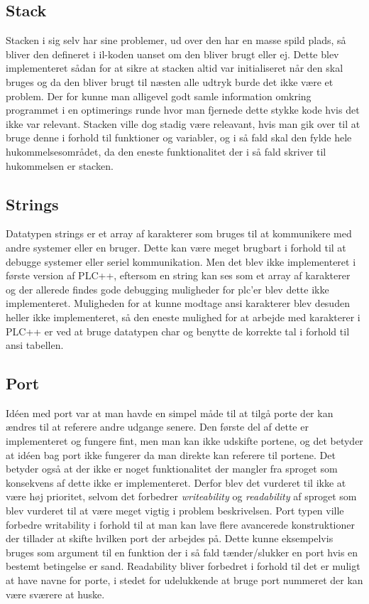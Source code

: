 \subsection*{Stack}
Stacken i sig selv har sine problemer, ud over den har en masse spild plads, så bliver den defineret i \gls{il}-koden uanset om den bliver brugt eller ej. Dette blev implementeret sådan for at sikre at stacken altid var initialiseret når den skal bruges og da den bliver brugt til næsten alle udtryk burde det ikke være et problem. Der for kunne man alligevel godt samle information omkring programmet i en optimerings runde hvor man fjernede dette stykke kode hvis det ikke var relevant. Stacken ville dog stadig være releavant, hvis man gik over til at bruge denne i forhold til funktioner og variabler, og i så fald skal den fylde hele hukommelsesområdet, da den eneste funktionalitet der i så fald skriver til hukommelsen er stacken.

\subsection*{Strings}
Datatypen strings er et array af karakterer som bruges til at kommunikere med andre systemer eller en bruger. Dette kan være meget brugbart i forhold til at debugge systemer eller seriel kommunikation. Men det blev ikke implementeret i første version af PLC++, eftersom en string kan ses som et array af karakterer og der allerede findes gode debugging muligheder for \gls{plc}'er blev dette ikke implementeret. Muligheden for at kunne modtage ansi karakterer blev desuden heller ikke implementeret, så den eneste mulighed for at arbejde med karakterer i PLC++ er ved at bruge datatypen char og benytte de korrekte tal i forhold til ansi tabellen.

\subsection*{Port}
Idéen med port var at man havde en simpel måde til at tilgå porte der kan ændres til at referere andre udgange senere. Den første del af dette er implementeret og fungere fint, men man kan ikke udskifte portene, og det betyder at idéen bag port ikke fungerer da man direkte kan referere til portene. Det betyder også at der ikke er noget funktionalitet der mangler fra sproget som konsekvens af dette ikke er implementeret. Derfor blev det vurderet til ikke at være høj prioritet, selvom det forbedrer \textit{writeability} og \textit{readability} af sproget som blev vurderet til at være meget vigtig i problem beskrivelsen. Port typen ville forbedre writability i forhold til at man kan lave flere avancerede konstruktioner der tillader at skifte hvilken port der arbejdes på. Dette kunne eksempelvis bruges som argument til en funktion der i så fald tænder/slukker en port hvis en bestemt betingelse er sand. Readability bliver forbedret i forhold til det er muligt at have navne for porte, i stedet for udelukkende at bruge port nummeret der kan være sværere at huske.



